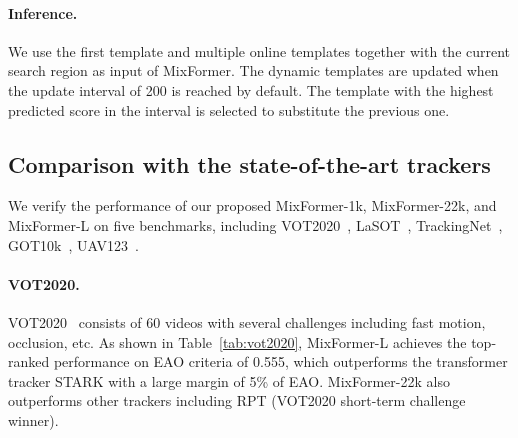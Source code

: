 \paragraph{Inference.}
We use the first template and multiple online templates together with the current search region as input of MixFormer. The dynamic templates are updated when the update interval of 200 is reached by default. The template with the highest predicted score in the interval is selected to substitute the previous one.

\subsection{Comparison with the state-of-the-art trackers}
We verify the performance of our proposed MixFormer-1k, MixFormer-22k, and MixFormer-L on five benchmarks, including VOT2020~\cite{vot2020}, LaSOT~\cite{lasot}, TrackingNet~\cite{trackingnet}, GOT10k~\cite{got10k}, UAV123~\cite{uav123}.
\vspace{-4mm}
\paragraph{VOT2020.}
VOT2020~\cite{vot2020} consists of 60 videos with several challenges including fast motion, occlusion, etc.
As shown in Table~\ref{tab:vot2020}, MixFormer-L achieves the top-ranked performance on EAO criteria of 0.555, which outperforms the transformer tracker STARK with a large margin of 5\% of EAO. MixFormer-22k also outperforms other trackers including RPT (VOT2020 short-term challenge winner).

